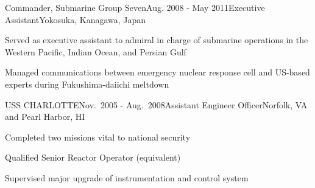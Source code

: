 
\begin{rSubsection}{Commander, Submarine Group Seven}{Aug. 2008 - May 2011}{Executive Assistant}{Yokosuka, Kanagawa, Japan}
\item Served as executive assistant to admiral in charge of submarine operations in the Western Pacific, Indian Ocean, and Persian Gulf
\item Managed communications between emergency nuclear response cell and US-based experts during Fukushima-daiichi meltdown
\end{rSubsection}


\begin{rSubsection}{USS CHARLOTTE}{Nov.\ 2005 - Aug.\ 2008}{Assistant Engineer Officer}{Norfolk, VA and Pearl Harbor, HI}
\item Completed two missions vital to national security
\item Qualified Senior Reactor Operator (equivalent)
\item Supervised major upgrade of instrumentation and control system
\end{rSubsection}
